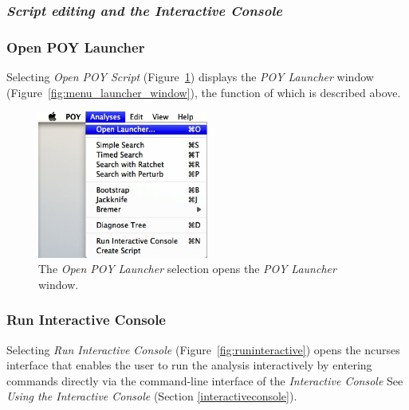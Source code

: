 {\subsubsection{\emph{Script editing and the Interactive Console}}

\subsubsection*{Open POY Launcher}

Selecting \emph{Open POY Script} (Figure~\ref{fig:open_poy_launcher}) displays the \emph{POY Launcher} 
window (Figure~\ref{fig:menu_launcher_window}), the function of which is described above.

\begin{figure}[htpb]
    \begin{center}
        \includegraphics[width=0.5\textwidth]{doc/figures/openpoylauncher_menu.jpg}
    \end{center}
    \caption{The \emph{Open POY Launcher} selection opens the \emph{POY Launcher} window.}
    \label{fig:open_poy_launcher}
\end{figure}

\subsubsection*{Run Interactive Console}

Selecting \emph{Run Interactive Console} (Figure~\ref{fig:runinteractive}) opens the ncurses interface
that enables the user to run the analysis interactively by entering \poy commands directly via the command-line interface of the \emph{Interactive Console} See \emph{Using the Interactive Console} (Section \ref{interactiveconsole}).

}
